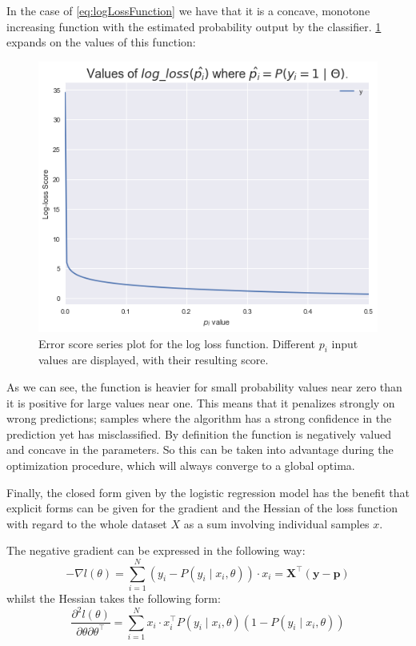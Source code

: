 In the case of \cref{eq:logLossFunction} we have that it is a concave, monotone increasing function with the estimated probability output by the classifier.
\cref{figure-logLossValues} expands on the values of this function:

\begin{figure}[h!]
\begin{center}
\includegraphics[width=0.7\columnwidth]{figures/logloss/figure-logLossValues.png}
\caption{ Error score series plot for the log loss function.
Different $p_i$ input values are displayed, with their resulting score.}
\label{figure-logLossValues}
\end{center}
\end{figure}

As we can see, the function is heavier for small probability values near zero than it is positive for large values near one.
This means that it penalizes strongly on wrong predictions; samples where the algorithm has a strong confidence in the prediction yet has misclassified.
By definition the function is negatively valued and concave in the parameters.
So this can be taken into advantage during the optimization procedure, which will always converge to a global optima.

Finally, the closed form given by the logistic regression model has the benefit that explicit forms can be given for the gradient and the Hessian of the loss function with regard to the whole dataset $X$ as a sum involving individual samples $x$.

The negative gradient can be expressed in the following way: %
\begin{equation}\label{eq:logitHessian1}
- \nabla l(\theta) = \sum_{i=1}^N (y_i - P(y_i \mid x_i,\theta))\cdot x_i = \textbf{X}^{\intercal}(\textbf{y}-\textbf{p})
\end{equation}
whilst the Hessian takes the following form:
\begin{equation}\label{eq:logitHessian2}
\frac{\partial^2 l(\theta)}{\partial \theta \partial \theta^\intercal} = \sum_{i=1}^N x_i \cdot x_i^\intercal P(y_i \mid x_i,\theta)(1 -P(y_i \mid x_i,\theta))
\end{equation}

